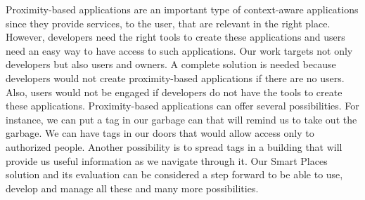 Proximity-based applications are an important type of context-aware applications since they provide services, to the user, that are relevant in the right place.
However, developers need the right tools to create these applications and users need an easy way to have access to such applications.
Our work targets not only developers but also users and owners.
A complete solution is needed because developers would not create proximity-based applications if there are no users.
Also, users would not be engaged if developers do not have the tools to create these applications.
Proximity-based applications can offer several possibilities.
For instance, we can put a tag in our garbage can that will remind us to take out the garbage.
We can have tags in our doors that would allow access only to authorized people.
Another possibility is to spread tags in a building that will provide us useful information as we navigate through it.
Our Smart Places solution and its evaluation can be considered a step forward to be able to use, develop and manage all these and many more possibilities.
